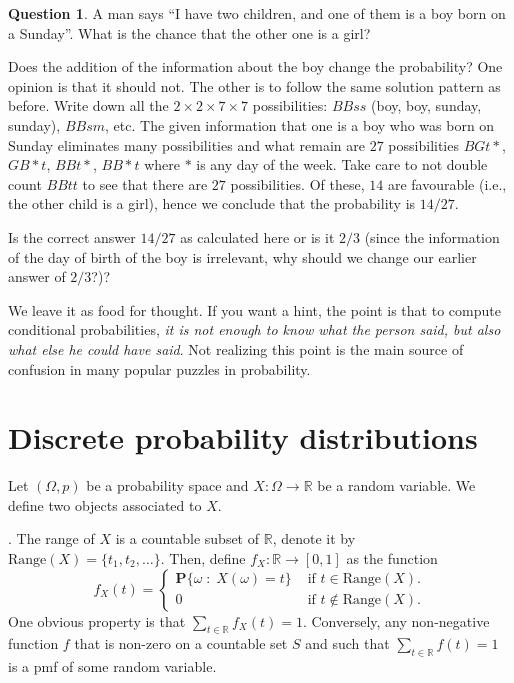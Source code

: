 \documentclass[preprint,  11pt]{amsart}
\newcommand{\parag}[1]{\vspace{4mm}\noindent{\bfseries #1}}
\theoremstyle{plain} %
\theoremstyle{definition} %
\newtheorem{question}[theorem]{Question}
\begin{document}
{{{{{{{{{{{{{{\begin{question} A man says ``I have two children, and one of them is a boy born on a Sunday''. What is the chance that the other one is a girl?
\end{question}
Does the addition of the information about the boy change the probability? One opinion is that it should not. The other is to follow the same solution pattern as before. Write down all the $2\times2\times7\times7$ possibilities: $BBss$ (boy, boy, sunday, sunday), $BBsm$, etc. The given information that one is a boy who was born on Sunday eliminates many possibilities and what remain are $27$ possibilities $BGt*$, $GB*t$, $BBt*$, $BB*t$ where $*$ is any day of the week. Take care to not double count $BBtt$ to see that there are $27$ possibilities. Of these, $14$ are favourable (i.e., the other child is a girl), hence we conclude that the probability is $14/27$.

Is the correct answer $14/27$ as calculated here or is it $2/3$ (since the  information of the day of birth of the boy is irrelevant, why should we change our earlier answer of $2/3$?)?

We leave it as food for thought. If you want a hint, the point is that to compute conditional probabilities, {\em it is not enough to know what the person said, but also what else he could have said}. Not realizing  this point is the main source of confusion in many  popular puzzles in probability.

\section{Discrete probability distributions}
Let $(\Omega,p)$ be a probability space and $X:\Omega\rightarrow \mathbb{R}$ be a random variable. We define two objects associated to $X$.

\parag{Probability mass function (pmf)}. The range of $X$ is a countable subset of $\mathbb{R}$, denote it by $\mbox{Range}(X)=\{t_{1},t_{2},\ldots\}$. Then, define $f_{X}:\mathbb{R}\rightarrow [0,1]$ as the function
$$
f_{X}(t)=\begin{cases}
\mathbf{P}\{\omega {\; : \;} X(\omega)=t\} & \mbox{ if }t\in \mbox{Range}(X). \\
0 & \mbox{ if }t\not\in \mbox{Range}(X).
\end{cases}
$$
One obvious property is that $\sum_{t\in \mathbb{R}}f_{X}(t)=1$. Conversely, any non-negative function $f$ that is non-zero on a countable set $S$ and such that $\sum_{t\in \mathbb{R}} f(t)=1$ is a pmf of some random variable.

}}}}}}}}}}}}}}
\end{document}
